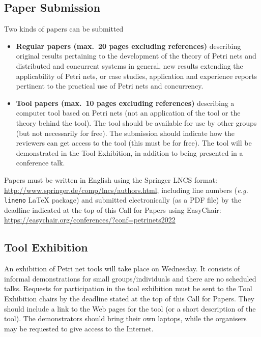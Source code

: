 \documentclass[10pt]{article}
\begin{document}
\subsection*{Paper Submission}
\vspace*{-0.5em}
Two kinds of papers can be submitted
\begin{itemize}
\item {\bf Regular papers (max.\ 20 pages excluding references)} describing original results pertaining
to the development of the theory of Petri nets and distributed and concurrent systems in
general, new results extending the applicability of Petri nets, or case studies, application
and experience reports pertinent to the practical use of Petri nets and concurrency.
\item {\bf Tool papers (max.\ 10 pages excluding references)} describing a computer tool based on Petri
nets (not an application of the tool or the theory behind the tool). The tool should
be available for use by other groups (but not necessarily for free). The submission
should indicate how the reviewers can get access to the tool (this must be for free).
The tool will be demonstrated in the Tool Exhibition, in addition to being presented
in a conference talk.
\end{itemize}

\noindent Papers must be written in English using the Springer LNCS format: \url{http://www.springer.de/comp/lncs/authors.html},
including line numbers (\emph{e.g.} \texttt{lineno} \LaTeX{} package)
and submitted electronically (as a PDF file) by the deadline indicated at the top
of this Call for Papers using EasyChair:
%
	\url{https://easychair.org/conferences/?conf=petrinets2022}

\subsection*{Tool Exhibition}
\vspace*{-0.5em}
An exhibition of Petri net tools will take place on Wednesday. It consists of informal
demonstrations for small groups/individuals and there are no scheduled talks. Requests
for participation in the tool exhibition must be sent to the Tool Exhibition chairs
by the deadline stated at the top of this Call for Papers. They should include a link
to the Web pages for the tool (or a short description of the tool). The demonstrators
should bring their own laptops, while the organisers may be requested to give access
to the Internet.
\end{document}
